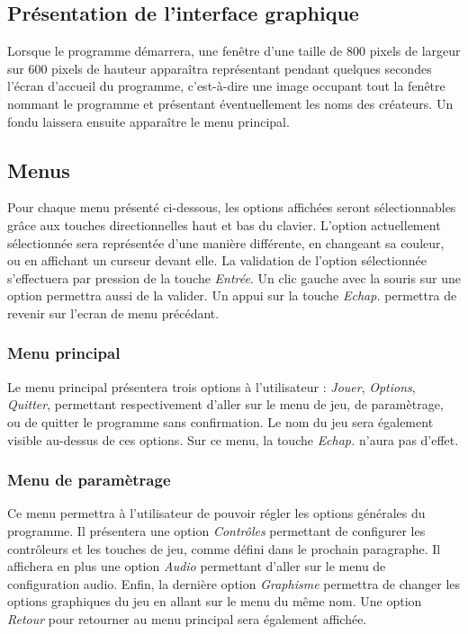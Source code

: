 \subsection{Présentation de l'interface graphique}

Lorsque le programme démarrera, une fenêtre d'une taille de 800 pixels de largeur sur 600 pixels de hauteur apparaîtra représentant pendant quelques secondes l'écran d'accueil du programme, c'est-à-dire une image occupant tout la fenêtre nommant le programme et présentant éventuellement les noms des créateurs. Un fondu laissera ensuite apparaître le menu principal.

\subsection{Menus}

Pour chaque menu présenté ci-dessous, les options affichées seront sélectionnables grâce aux touches directionnelles haut et bas du clavier. L'option  actuellement sélectionnée sera représentée d'une manière différente, en changeant sa couleur, ou en affichant un curseur devant elle. La validation de l'option sélectionnée s'effectuera par pression de la touche \emph{Entrée}. Un clic gauche avec la souris sur une option permettra aussi de la valider. Un appui sur la touche \emph{Echap.} permettra de revenir sur l'ecran de menu précédant.

\subsubsection{Menu principal}

Le menu principal présentera trois options à l'utilisateur : \emph{Jouer}, \emph{Options}, \emph{Quitter}, permettant respectivement d'aller sur le menu de jeu, de paramètrage, ou de quitter le programme sans confirmation. Le nom du jeu sera également visible au-dessus de ces options. Sur ce menu, la touche \emph{Echap.} n'aura pas d'effet.

\subsubsection{Menu de paramètrage}

Ce menu permettra à l'utilisateur de pouvoir régler les options générales du programme. Il présentera une option \emph{Contrôles} permettant de configurer les contrôleurs et les touches de jeu, comme défini dans le prochain paragraphe. Il affichera en plus une option \emph{Audio} permettant d'aller sur le menu de configuration audio. Enfin, la dernière option \emph{Graphisme} permettra de changer les options graphiques du jeu en allant sur le menu du même nom. Une option \emph{Retour} pour retourner au menu principal sera également affichée.

